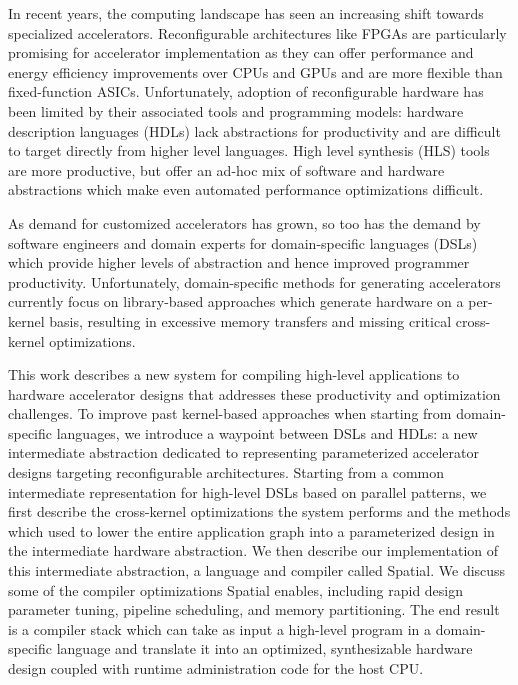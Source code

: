In recent years, the computing landscape has seen an increasing shift towards
specialized accelerators. Reconfigurable architectures like FPGAs are
particularly promising for accelerator implementation as they can offer
performance and energy efficiency improvements over CPUs and GPUs and are more
flexible than fixed-function ASICs. Unfortunately, adoption of reconfigurable
hardware has been limited by their associated tools and programming models:
hardware description languages (HDLs) lack abstractions for productivity and are
difficult to target directly from higher level languages. High level synthesis
(HLS) tools are more productive, but offer an ad-hoc mix of software and
hardware abstractions which make even automated performance optimizations
difficult.

As demand for customized accelerators has grown, so too has the
demand by software engineers and domain experts for domain-specific
languages (DSLs) which provide higher levels of abstraction and hence improved
programmer productivity.
Unfortunately, domain-specific methods for generating accelerators currently
focus on library-based approaches which generate
hardware on a per-kernel basis, resulting in excessive memory transfers and
missing critical cross-kernel optimizations.

This work describes a new system for compiling high-level applications to
hardware accelerator designs that addresses these productivity and optimization
challenges. To improve past kernel-based
approaches when starting from domain-specific languages, we
introduce a waypoint between DSLs and HDLs: a new intermediate abstraction
dedicated to representing parameterized accelerator designs
targeting reconfigurable architectures.
Starting from a common intermediate
representation for high-level DSLs based on parallel patterns, we first describe
the cross-kernel optimizations the system performs and the methods which used to
lower the entire application graph into a parameterized design in the
intermediate hardware abstraction.
We then describe our implementation of
this intermediate abstraction, a language and compiler called Spatial.
We discuss some of the compiler optimizations Spatial enables,
including rapid design parameter tuning, pipeline scheduling, and
memory partitioning.
The end result is a compiler stack which can take as input a high-level program in a domain-specific
language and translate it into an optimized, synthesizable hardware design coupled with
runtime administration code for the host CPU.


